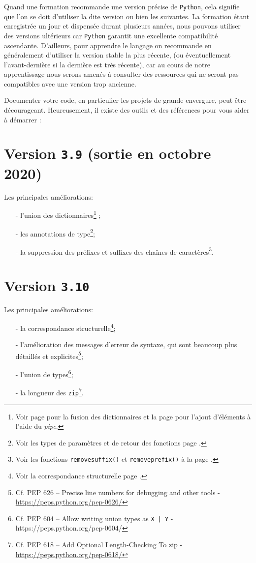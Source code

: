 \documentclass[a4paper,12pt]{book}
\begin{document}
Quand une formation recommande une version précise de \texttt{Python}, cela signifie que l'on se doit d'utiliser la dite version ou bien les suivantes. La formation étant enregistrée un jour et dispensée durant plusieurs années, nous pouvons utiliser des versions ultérieurs car \texttt{Python} garantit une excellente compatibilité ascendante. D'ailleurs, pour apprendre le langage on recommande en généralement d'utiliser la version stable la plus récente, (ou éventuellement l'avant-dernière si la dernière est très récente), car au cours de notre apprentissage nous serons amenés à consulter des ressources qui ne seront pas compatibles avec une version trop ancienne. 
\medskip

Documenter votre code, en particulier les projets de grande envergure, peut être décourageant. Heureusement, il existe des outils et des références pour vous aider à démarrer :
\section{Version \texttt{3.9} (sortie en octobre 2020)}
Les principales améliorations:
\begin{enumerate}
	\item[-] l'union des dictionnaires\footnote{Voir page \pageref{fusion_dict} pour la fusion des dictionnaires et la page \pageref{utilisation_dict} pour l'ajout d'éléments à l'aide du \og \textit{pipe}\fg{}.} ;
	\item[-] les annotations de type\footnote{Voir les types de paramètres et de retour des fonctions page \pageref{annotation_types}.};
	\item[-] la suppression des préfixes et suffixes des chaînes de caractères\footnote{Voir les fonctions \texttt{removesuffix()} et \texttt{removeprefix()} à la page \pageref{prefix_suffix}.}.
\end{enumerate}
\medskip

\section{Version \texttt{3.10}}
Les principales améliorations:
\begin{enumerate}
	\item[-] la correspondance structurelle\footnote{Voir la correspondance structurelle page \pageref{correspondance_structurelle}.};
	\item[-] l'amélioration des messages d'erreur de syntaxe, qui sont beaucoup plus détaillés et explicites\footnote{Cf. PEP 626 – Precise line numbers for debugging and other tools - \url{https://peps.python.org/pep-0626/}};
\item[-] l'union de types\footnote{Cf. PEP 604 – Allow writing union types as \texttt{X | Y} - https://peps.python.org/pep-0604/};
	\item[-] la longueur des \texttt{zip}\footnote{Cf. PEP 618 – Add Optional Length-Checking To zip - \url{https://peps.python.org/pep-0618/}}.
\end{enumerate}
\medskip
\end{document}
